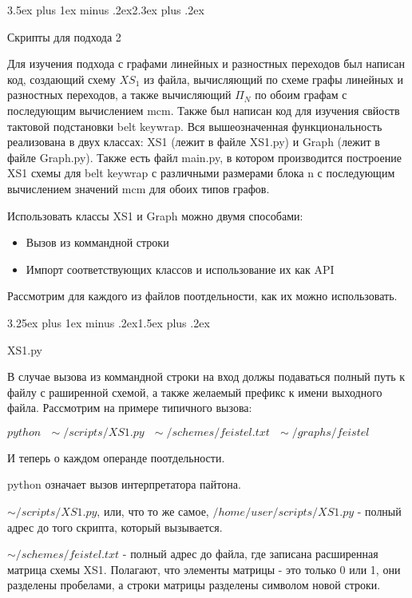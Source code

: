 \documentclass[a4paper,12pt]{report}
\makeatletter
\theoremstyle{plain} %
\theoremstyle{definition}
\theoremstyle{remark}
\renewcommand{\section}{\@startsection{section}{1}{18pt}%
{3.5ex plus 1ex minus .2ex}{2.3ex plus .2ex}%
{\normalfont\Large\bfseries\raggedright}}%
\renewcommand{\subsection}{\@startsection{subsection}{2}{18pt}%
{3.25ex plus 1ex minus .2ex}{1.5ex plus .2ex}%
{\normalfont\large\bfseries\raggedright}}%
\makeatother
\begin{document}
\begin{large}
\section{Скрипты для подхода 2}

Для изучения подхода с графами линейных и разностных переходов был написан код, создающий схему $XS_1$ из файла, вычисляющий по схеме графы линейных и разностных переходов, а также вычисляющий $\Pi_N$ по обоим графам с последующим вычислением mcm. Также был написан код для изучения свйоств тактовой подстановки belt keywrap. Вся вышеозначенная функциональность реализована в двух классах: XS1 (лежит в файле XS1.py) и Graph (лежит в файле Graph.py). Также есть файл main.py, в котором производится построение XS1 схемы для belt keywrap с различными размерами блока n с последующим вычислением значений mcm для обоих типов графов. 

 Использовать классы XS1 и Graph можно двумя способами:

\begin{itemize}
\item Вызов из коммандной строки
\item Импорт соответствующих классов и использование их как API
\end{itemize}

Рассмотрим для каждого из файлов поотдельности, как их можно использовать.

\subsection{XS1.py}

В случае вызова из коммандной строки на вход должы подаваться полный путь к файлу с раширенной схемой, а также желаемый префикс к имени выходного файла. Рассмотрим на примере типичного вызова:

$python ~~~\sim/scripts/XS1.py~~~ \sim/schemes/feistel.txt~~~ \sim/graphs/feistel$

И теперь о каждом операнде поотдельности.

python означает вызов интерпретатора пайтона.

$\sim/scripts/XS1.py$, или, что то же самое, $/home/user/scripts/XS1.py$ - полный адрес до того скрипта, который вызывается.

$\sim/schemes/feistel.txt$ - полный адрес до файла, где записана расширенная матрица схемы XS1. Полагают, что элементы матрицы - это только 0 или 1, они разделены пробелами, а строки матрицы разделены символом новой строки.


\end{large}
\end{document}
